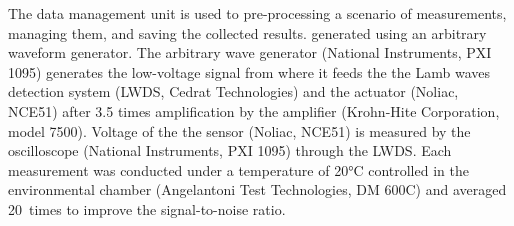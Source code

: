 The data management unit is used to pre-processing a scenario of measurements, managing them, and saving the collected results.
generated using an arbitrary waveform generator.
The arbitrary wave generator (National Instruments, PXI 1095) generates the low-voltage signal from where it feeds the the Lamb waves detection system (LWDS, Cedrat Technologies) and the actuator (Noliac, NCE51) after 3.5 times amplification by the  amplifier (Krohn-Hite Corporation, model 7500).
Voltage of the the sensor (Noliac, NCE51) is measured by the oscilloscope (National Instruments, PXI 1095) through the LWDS.
Each measurement was conducted under a temperature of 20\unit{\degreeCelsius} controlled in the environmental chamber (Angelantoni Test Technologies, DM 600C) and averaged 20~times to improve the signal-to-noise ratio.